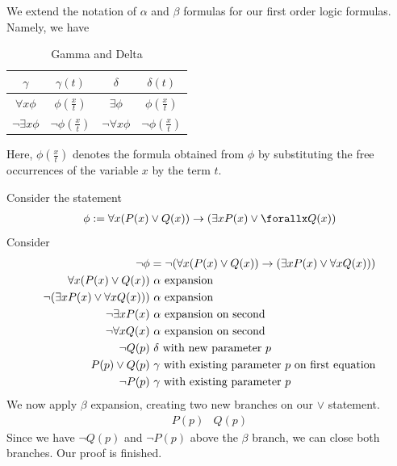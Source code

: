 \documentclass[a4paper]{article}
\theoremstyle{plain}
\theoremstyle{definition}
\newtheorem{defn}{Definition}[section]
\newtheorem{exmp}{Example}[section]
\theoremstyle{remark}
\begin{document}
\begin{tcolorbox}[colback=black!3!white,colframe=black!60!white,title=\begin{defn}Gamma and Delta Formulas \label{Gamma and}\end{defn}]
We extend the notation of $\alpha$ and $\beta$ formulas for our first order logic formulas. Namely, we have
\begin{table}[H]
	\centering
	\caption{Gamma and Delta}
	\label{tab:label}
	\begin{tabular}{cc|cc}
	$\gamma$ & $\gamma(t)$ & $\delta$ & $\delta(t)$ \\
	\hline
	$\forall x \phi$ & $\phi(\frac{x}{t})$ & $\exists \phi$ & $\phi(\frac{x}{t})$ \\
	$\neg \exists x \phi$ & $\neg \phi(\frac{x}{t})$ & $\neg \forall  x \phi$ & $\neg \phi ( \frac{x}{t})$
	\end{tabular}
\end{table}
	Here, $\phi(\frac{x}{t})$ denotes the formula obtained from $\phi$ by substituting the free occurrences of the variable $x$ by the term $t$.
\end{tcolorbox}
\begin{tcolorbox}[colback=black!3!white,colframe=black!60!white,title=\begin{exmp}Tableau Example \label{Tableau Example}\end{exmp}]
        Consider the statement
                \begin{align}
                \phi := \forall x(P(x) \lor Q(x)) \to  (\exists x P(x) \lor \forallx Q(x))
                \end{align}
		Consider
		\begin{align}
			\neg \phi &= \neg (\forall x(P(x) \lor Q(x)) \to  (\exists x P(x) \lor \forall xQ(x))) \\
			\forall x (P(x) \lor Q(x))  & \text{ $\alpha$ expansion}\\ 
			\neg (\exists x P(x) \lor \forall  x Q(x)) )& \text{ $ \alpha$ expansion} \\
			\neg \exists x P(x) & \text{ $\alpha$ expansion on second}\\
		\neg \forall x Q(x)	& \text{ $ \alpha$ expansion on second}	\\
		\neg Q(p) & \text{ $\delta$ with new parameter $p$} \\
		P(p)  \lor Q(p) & \text{ $\gamma$ with existing parameter $p$ on first equation}\\
		\neg P(p) & \text{ $\gamma$ with existing parameter $p$} 
		\end{align}
		We now apply $\beta$ expansion, creating two new branches on our $\lor$ statement.
		\begin{align}
			P(p) & Q(p)
		\end{align}
		Since we have $\neg Q(p)$ and $\neg P(p)$ above the  $\beta$ branch, we can close both branches. Our proof is finished.
\end{tcolorbox}
\end{document}

